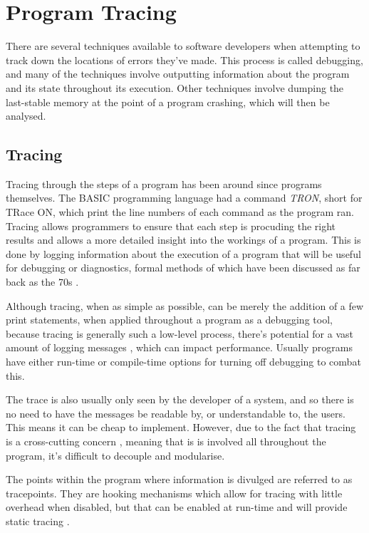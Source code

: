 \documentclass{UoYCSproject}
\begin{document}

\section{Program Tracing}
There are several techniques available to software developers when attempting to track down the locations of errors they've made. This process is called debugging, and many of the techniques involve outputting information about the program and its state throughout its execution. Other techniques involve dumping the last-stable memory at the point of a program crashing, which will then be analysed. 

\subsection{Tracing}
Tracing through the steps of a program has been around since programs themselves. The BASIC programming language had a command \emph{TRON}, short for TRace ON, which print the line numbers of each command as the program ran. 
Tracing allows programmers to ensure that each step is procuding the right results and allows a more detailed insight into the workings of a program. This is done by logging information about the execution of a program that will be useful for debugging or diagnostics, formal methods of which have been discussed as far back as the 70s \cite{psych_debug, code_walkthroughs}.

Although tracing, when as simple as possible, can be merely the addition of a few print statements, when applied throughout a program as a debugging tool, because tracing is generally such a low-level process, there's potential for a vast amount of logging messages \cite{}, which can impact performance. Usually programs have either run-time or compile-time options for turning off debugging to combat this. %

The trace is also usually only seen by the developer of a system, and so there is no need to have the messages be readable by, or understandable to, the users. This means it can be cheap to implement. However, due to the fact that tracing is a cross-cutting concern \cite{}, meaning that is is involved all throughout the program, it's difficult to decouple and modularise. %

The points within the program where information is divulged are referred to as tracepoints. They are hooking mechanisms which allow for tracing with little overhead when disabled, but that can be enabled at run-time and will provide static tracing \cite{tracing_book}.
\end{document}
